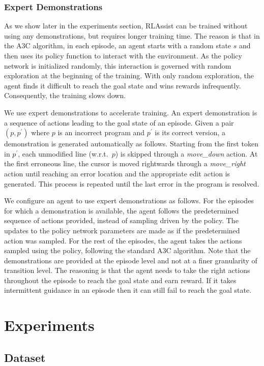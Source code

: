 \documentclass{article}
\begin{document}
\subsubsection{Expert Demonstrations}
As we show later in the experiments section, RLAssist can be trained without using any demonstrations, but requires longer training time.
The reason is that in the A3C algorithm, in each episode, an agent starts with a random state $ s $ and then uses its policy function to interact with the environment.
As the policy network is initialized randomly, this interaction is governed with random exploration at the beginning of the training.
With only random exploration, the agent finds it difficult to reach the goal state and wins rewards infrequently. Consequently, the training slows down.

We use expert demonstrations to accelerate training. 
An expert demonstration is a sequence of actions leading to the goal state of an episode.
Given a pair $ (p, p^{\prime}) $ where $ p $ is an incorrect program and $ p^{\prime} $ is its correct version, a demonstration is generated automatically as follows.
Starting from the first token in $ p^{\prime} $, each unmodified line (w.r.t.\ $ p $) is skipped through a \emph{move\_down} action.
At the first erroneous line, the cursor is moved rightwards through a \emph{move\_right} action until reaching an error location and the appropriate edit action is generated. This process is repeated until the last error in the program is resolved.

We configure an agent to use expert demonstrations as follows.
For the episodes for which a demonstration is available, the agent follows the predetermined sequence of actions provided, instead of sampling driven by the policy.
The updates to the policy network parameters are made as if the predetermined action was sampled.
For the rest of the episodes, the agent takes the actions sampled using the policy, following the standard A3C algorithm.
Note that the demonstrations are provided at the episode level and not at a finer granularity of transition level.
The reasoning is that the agent needs to take the right actions throughout the episode to reach the goal state and earn reward. 
If it takes intermittent guidance in an episode then it can still fail to reach the goal state.
 \section{Experiments}

\subsection{Dataset}
\end{document}
